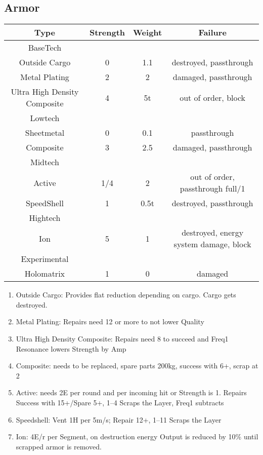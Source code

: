 \subsection{Armor}\label{subsec:armor}
\begin{tabular}{c|ccc}
    Type & Strength & Weight & Failure\\
    \hline BaseTech&&&\\
    Outside Cargo & 0 & 1.1 & destroyed, passthrough\\
    Metal Plating & 2 & 2 & damaged, passthrough\\
    Ultra High Density Composite & 4 & 5t & out of order, block\\
    \hline Lowtech &&&\\
    Sheetmetal & 0 & 0.1 & passthrough \\
    Composite & 3 & 2.5 & damaged, passthrough \\
    \hline Midtech &&&\\
    Active & 1/4 & 2 & out of order, passthrough full/1\\
    SpeedShell & 1 & 0.5t & destroyed, passthrough \\
    \hline Hightech &&&\\
    Ion & 5 & 1 & destroyed, energy system damage, block \\
    \hline Experimental &&&\\
    Holomatrix & 1 & 0 & damaged\\
\end{tabular}

\begin{enumerate}[label = - ]
    \item Outside Cargo: Provides flat reduction depending on cargo.
    Cargo gets destroyed.
    \item Metal Plating: Repairs need 12 or more to not lower Quality
    \item Ultra High Density Composite: Repairs need 8 to succeed and Freq1 Resonance lowers Strength by Amp
    \item Composite: needs to be replaced, spare parts 200kg, success with 6+, scrap at 2
    \item Active: needs 2E per round and per incoming hit or Strength is 1.
    Repairs Success with 15+/Spare 5+, 1--4 Scraps the Layer, Freq1 subtracts
    \item Speedshell: Vent 1H per 5m/s;
    Repair 12+, 1--11 Scraps the Layer
    \item Ion: 4E/r per Segment, on destruction energy Output is reduced by 10\% until scrapped armor is removed.
\end{enumerate}

